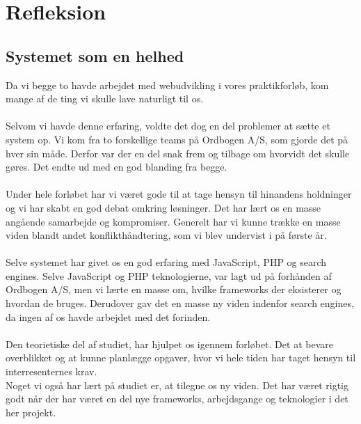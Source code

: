 \section{Refleksion}
\subsection{Systemet som en helhed}
Da vi begge to havde arbejdet med webudvikling i vores praktikforløb, kom mange af de ting vi skulle lave naturligt til os.
\\\\
Selvom vi havde denne erfaring, voldte det dog en del problemer at sætte et system op. Vi kom fra to forskellige teams på Ordbogen A/S, som gjorde det på hver sin måde. 
Derfor var der en del snak frem og tilbage om hvorvidt det skulle gøres. Det endte ud med en god blanding fra begge. 
\\\\
Under hele forløbet har vi været gode til at tage hensyn til hinandens holdninger og vi har skabt en god debat omkring løsninger. Det har lært os en masse angående samarbejde og kompromiser. 
Generelt har vi kunne trække en masse viden blandt andet konflikthåndtering, som vi blev undervist i på første år. 
\\\\
Selve systemet har givet os en god erfaring med JavaScript, PHP og search engines. 
Selve JavaScript og PHP teknologierne, var lagt ud på forhånden af Ordbogen A/S,
men vi lærte en masse om, hvilke frameworks der eksisterer og hvordan de bruges.
Derudover gav det en masse ny viden indenfor search engines, da ingen af os havde arbejdet med det forinden. 
\\\\
Den teorietiske del af studiet, har hjulpet os igennem forløbet. Det at bevare overblikket og at kunne planlægge opgaver, 
hvor vi hele tiden har taget hensyn til interresenternes krav.
\\
Noget vi også har lært på studiet er, at tilegne os ny viden. Det har været rigtig godt når
der har været en del nye frameworks, arbejdsgange og teknologier i det her projekt.
